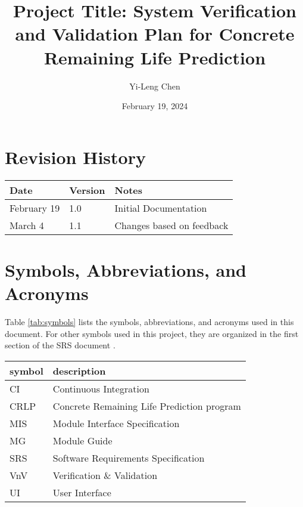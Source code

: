 \documentclass[12pt, titlepage]{article}
\begin{document}
\title{Project Title: System Verification and Validation Plan for Concrete Remaining Life Prediction} 
\author{Yi-Leng Chen}
\date{February 19, 2024}
	
\maketitle


\section*{Revision History}

\begin{tabularx}{\textwidth}{p{3cm}p{2cm}X}
\toprule {\bf Date} & {\bf Version} & {\bf Notes}\\
\midrule
February 19 & 1.0 & Initial Documentation\\
March 4 & 1.1 & Changes based on feedback \\

\bottomrule
\end{tabularx}

\newpage

\tableofcontents

\listoftables

\newpage

\section{Symbols, Abbreviations, and Acronyms}

Table \ref{tab:symbols} lists the symbols, abbreviations, and acronyms used in this document. For other symbols used in this project, they are organized in the first section of the SRS document \cite{srs}.
\newline

\renewcommand{\arraystretch}{1.2}
\begin{tabular}{l l} 
  \toprule		
  \textbf{symbol} & \textbf{description}\\
  \midrule 
  CI & Continuous Integration \\
  CRLP & Concrete Remaining Life Prediction program \\
  MIS & Module Interface Specification \\
  MG & Module Guide \\
  SRS & Software Requirements Specification \\
  VnV & Verification \& Validation \\
  UI & User Interface\\
  \bottomrule
\end{tabular}\\
\label{tab:symbols}
\end{document}
